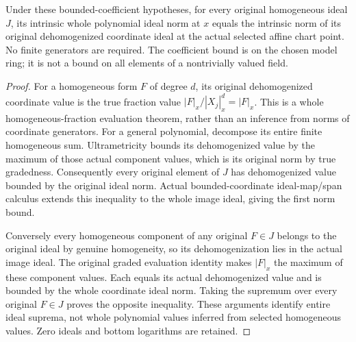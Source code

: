 \begin{theorem}
\label{projective:native-homogeneous-ideal-coordinate-norm}
\leanok
{}
Under these bounded-coefficient hypotheses, for every original homogeneous
ideal $J$, its intrinsic whole polynomial ideal norm at $x$ equals the
intrinsic norm of its original dehomogenized coordinate ideal at the
actual selected affine chart point. No finite generators are required. The coefficient bound is on the
chosen model ring; it is not a bound on all elements of a nontrivially
valued field.
\end{theorem}
\begin{proof}
For a homogeneous form $F$ of degree $d$, its original dehomogenized
coordinate value is the true fraction value $|F|_x/|X_j|_x^d=|F|_x$.
This is a whole homogeneous-fraction evaluation theorem, rather than an
inference from norms of coordinate generators. For a general polynomial,
decompose its entire finite homogeneous sum. Ultrametricity bounds its
dehomogenized value by the maximum of those actual component values,
which is its original norm by true gradedness. Consequently every
original element of $J$ has dehomogenized value bounded by the original
ideal norm. Actual bounded-coordinate ideal-map/span calculus extends
this inequality to the whole image ideal, giving the first norm bound.

Conversely every homogeneous component of any original $F\in J$ belongs
to the original ideal by genuine homogeneity, so its dehomogenization
lies in the actual image ideal. The original graded evaluation identity
makes $|F|_x$ the maximum of these component values. Each equals its
actual dehomogenized value and is bounded by the whole coordinate ideal
norm. Taking the supremum over every original $F\in J$ proves the
opposite inequality. These arguments identify entire ideal suprema,
not whole polynomial values inferred from selected homogeneous values.
Zero ideals and bottom logarithms are retained.
\end{proof}

